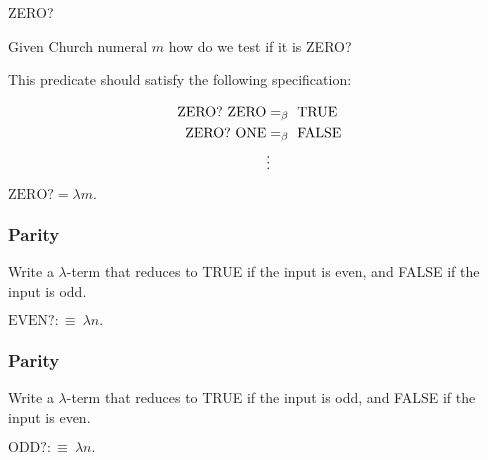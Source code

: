 \documentclass{beamer}
\begin{document}
\begin{frame}{ZERO?}
  
  Given Church numeral $m$ how do we test if it is ZERO?
  
  \vspace{0.3cm}

  This predicate should satisfy the following specification:
  
  	\begin{align*}
		\text{ZERO?} \ \text{ZERO} &=_{\beta} \ \text{TRUE} \\
		\text{ZERO?} \ \text{ONE} &=_{\beta} \ \text{FALSE} \\
		&\vdots
	\end{align*}
  
  $\text{ZERO?} = \lambda m.  \ $
  
  \vspace{2cm}  
  
\end{frame}

\begin{frame}
	\frametitle{Parity}

	Write a $\lambda$-term that reduces to TRUE if the input is even, and FALSE if the input is odd. 

	$\text{EVEN?} :\equiv \ \lambda n. \ $

	\vspace{50mm}

\end{frame}

\begin{frame}
	\frametitle{Parity}

	Write a $\lambda$-term that reduces to TRUE if the input is odd, and FALSE if the input is even. 

	$\text{ODD?} :\equiv \ \lambda n. \ $

	\vspace{50mm}

\end{frame}
\end{document}
